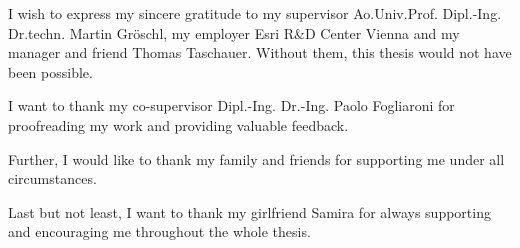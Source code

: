 I wish to express my sincere gratitude to my supervisor Ao.Univ.Prof. Dipl.-Ing. Dr.techn. Martin Gröschl, my employer Esri R\&D Center Vienna and my manager and friend Thomas Taschauer. Without them, this thesis would not have been possible.

I want to thank my co-supervisor Dipl.-Ing. Dr.-Ing. Paolo Fogliaroni for proofreading my work and providing valuable feedback.

Further, I would like to thank my family and friends for supporting me under all circumstances.

Last but not least, I want to thank my girlfriend Samira for always supporting and encouraging me throughout the whole thesis.
